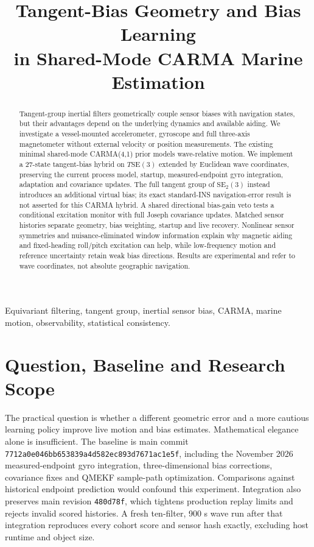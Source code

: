 \documentclass[conference]{IEEEtran}
\title{Tangent-Bias Geometry and Bias Learning\\in Shared-Mode CARMA Marine Estimation}
\author{\IEEEauthorblockN{Mikhail S. Grushinskiy}
\IEEEauthorblockA{Bareboat Necessities, ocean-IMU project\\Independent Researcher, Fair Lawn, NJ, USA}}
\begin{document}
\maketitle
\begin{abstract}
\normalfont
Tangent-group inertial filters geometrically couple sensor biases with
navigation states, but their advantages depend on the underlying dynamics
and available aiding. We investigate a vessel-mounted accelerometer,
gyroscope and full three-axis magnetometer without external velocity or
position measurements. The existing minimal shared-mode CARMA(4,1) prior
models wave-relative motion. We implement a 27-state tangent-bias hybrid on
$T\mathrm{SE}(3)$ extended by Euclidean wave coordinates, preserving the
current process model, startup, measured-endpoint gyro integration,
adaptation and covariance updates. The full tangent group of
$\mathrm{SE}_2(3)$ instead introduces an additional virtual bias; its exact
standard-INS navigation-error result is not asserted for this CARMA hybrid.
A shared directional bias-gain veto tests a conditional excitation monitor
with full Joseph covariance updates. Matched sensor histories separate
geometry, bias weighting, startup and live recovery. \StudyHeadline{}
Nonlinear sensor symmetries and nuisance-eliminated window information
explain why magnetic aiding and fixed-heading roll/pitch excitation can
help, while low-frequency motion and reference uncertainty retain weak
bias directions. Results are experimental and refer to wave coordinates,
not absolute geographic navigation.
\end{abstract}
\begin{IEEEkeywords}
Equivariant filtering, tangent group, inertial sensor bias, CARMA, marine
motion, observability, statistical consistency.
\end{IEEEkeywords}

\section{Question, Baseline and Research Scope}
The practical question is whether a different geometric error and a more
cautious learning policy improve live motion and bias estimates. Mathematical
elegance alone is insufficient. The baseline is main commit
\texttt{7712a0e046bb653839a4d582ec893d7671ac1e5f}, including the November 2026
measured-endpoint gyro integration, three-dimensional bias corrections,
covariance fixes and QMEKF sample-path optimization. Comparisons against
historical endpoint prediction would confound this experiment.
Integration also preserves main revision \texttt{480d78f}, which tightens
production replay limits and rejects invalid scored histories. A fresh
ten-filter, 900 s wave run after that integration reproduces every cohort
score and sensor hash exactly, excluding host runtime and object size.
\end{document}
